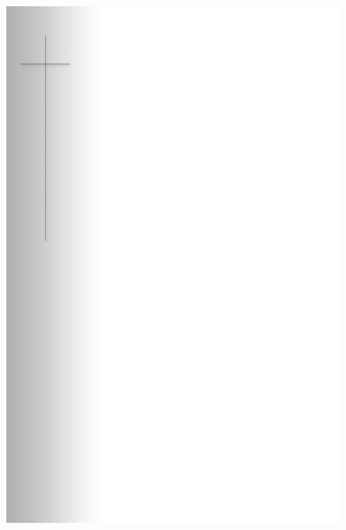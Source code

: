 \documentclass[ngerman,a4paper,11pt]{scrreprt}
\begin{document}
\begin{figure}[H]
\centering
\includegraphics[width=\textwidth,height=.8\textheight]{Bilder/Bilder/./750_0010_12278_1032674_Kreuz.png}
\end{figure}
\end{document}
